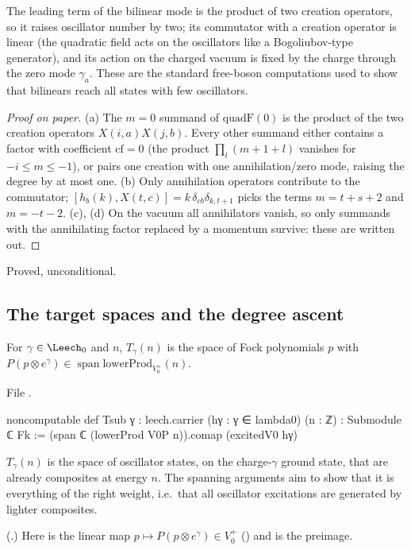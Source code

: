 \begin{physics}
The leading term of the bilinear mode is the product of two creation operators, so it raises oscillator number by two; its commutator with a creation operator is linear (the quadratic field acts on the oscillators like a Bogoliubov-type generator), and its action on the charged vacuum is fixed by the charge through the zero mode $\gamma_a$. These are the standard free-boson computations used to show that bilinears reach all states with few oscillators.
\end{physics}
\begin{proof}[Proof on paper]
(a) The $m=0$ summand of $\mathrm{quadF}(0)$ is the product of the two creation operators
$X(i,a)X(j,b)$.  Every other summand either contains a factor with coefficient $\mathrm{cf}=0$ (the
product $\prod_l(m+1+l)$ vanishes for $-i\le m\le-1$), or pairs one creation with one
annihilation/zero mode, raising the degree by at most one.  (b) Only annihilation operators
contribute to the commutator; $[h_b(k),X(t,c)]=k\,\delta_{cb}\delta_{k,t+1}$ picks the terms
$m=t+s+2$ and $m=-t-2$.  (c), (d) On the vacuum all annihilators vanish, so only summands with the
annihilating factor replaced by a momentum survive: these are written out.
\end{proof}
\begin{status}Proved, unconditional.\end{status}

\subsection{The target spaces and the degree ascent}

\begin{definition}\label{ch12:def:Tsub}
For $\gamma\in\Leech_0$ and $n$, $T_\gamma(n)$ is the space of Fock polynomials $p$ with
$P(p\otimes e^\gamma)\in\operatorname{span}\mathrm{lowerProd}_{V_0^+}(n)$.
\end{definition}
File .
\begin{leancode}
noncomputable def Tsub {γ : leech.carrier} (hγ : γ ∈ lambda0) (n : ℤ) : Submodule ℂ Fk :=
  (span ℂ (lowerProd V0P n)).comap (excitedV0 hγ)
\end{leancode}

\begin{physics}
$T_\gamma(n)$ is the space of oscillator states, on the charge-$\gamma$ ground state, that are already composites at energy $n$. The spanning arguments aim to show that it is everything of the right weight, i.e.\ that all oscillator excitations are generated by lighter composites.
\end{physics}
(.)  Here  is the linear map $p\mapsto
P(p\otimes e^\gamma)\in V_0^+$ () and  is the preimage.

